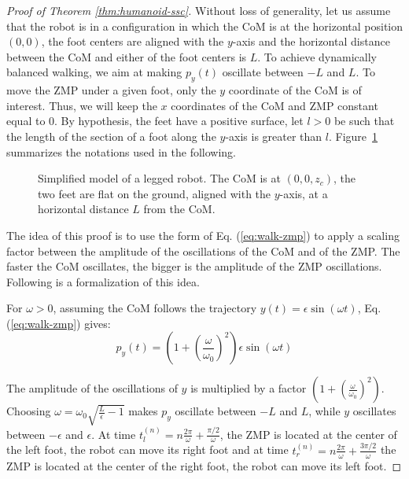 \begin{proof}[Proof of Theorem \ref{thm:humanoid-ssc}]
Without loss of generality, let us assume that the robot is in a
configuration in which the CoM is at the horizontal position $(0,0)$,
the foot centers are aligned with the $y$-axis and the horizontal
distance between the CoM and either of the foot centers is $L$. To
achieve dynamically balanced walking, we aim at making $p_y(t)$
oscillate between $-L$ and $L$. To move the ZMP under a given foot,
only the $y$ coordinate of the CoM is of interest. Thus, we will keep
the $x$ coordinates of the CoM and ZMP constant equal to $0$. By
hypothesis, the feet have a positive surface, let $l>0$ be such that
the length of the section of a foot along the $y$-axis is greater than
$l$. Figure~\ref{fig:simple-humanoid} summarizes the notations used in
the following.

\begin{figure}
  \centering
  

  \caption{Simplified model of a legged robot. The CoM is at
    $(0,0,z_c)$, the two feet are flat on the ground, aligned with the
    $y$-axis, at a horizontal distance $L$ from the CoM.}
  \label{fig:simple-humanoid}
\end{figure}

The idea of this proof is to use the form of Eq. (\ref{eq:walk-zmp})
to apply a scaling factor between the amplitude of the oscillations of
the CoM and of the ZMP. The faster the CoM oscillates, the bigger is
the amplitude of the ZMP oscillations. Following is a formalization of
this idea.

For $\omega >0$, assuming the CoM follows the trajectory
$y(t) = \epsilon \sin(\omega t)$,  Eq. (\ref{eq:walk-zmp}) gives:
\[
p_y(t) = (1+\left(\frac{\omega}{\omega_0}\right)^2)\epsilon\sin(\omega
t)
\]

The amplitude of the oscillations of $y$ is multiplied by a factor
$(1+\left(\frac{\omega}{\omega_0}\right)^2)$.  Choosing $\omega =
\omega_0 \sqrt{\frac{L}{\epsilon} -1}$ makes $p_y$ oscillate between
$-L$ and $L$, while $y$ oscillates between $-\epsilon$ and $\epsilon$.
At time $t_l^{(n)} = n\frac{2\pi}{\omega} + \frac{\pi/2}{\omega}$, the
ZMP is located at the center of the left foot, the robot can move its
right foot and at time $t_r^{(n)} = n\frac{2\pi}{\omega} +
\frac{3\pi/2}{\omega}$ the ZMP is located at the center of the right
foot, the robot can move its left foot.


\end{proof}
